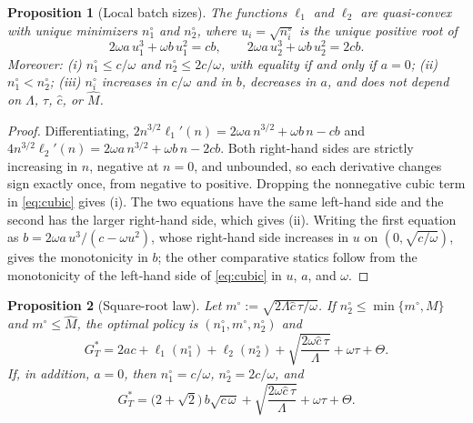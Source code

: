 \documentclass[10pt, reqno]{amsart}
\newtheorem{proposition}{Proposition}
\theoremstyle{definition}
\begin{document}
\begin{proposition}[Local batch sizes]\label{prop:local}
The functions $\ell_1$ and $\ell_2$ are quasi-convex with unique minimizers $n_1^\circ$ and $n_2^\circ$, where $u_i=\sqrt{n_i^\circ}$ is the unique positive root of
\begin{equation}\label{eq:cubic}
2\omega a\,u_1^3+\omega b\,u_1^2=cb,\qquad 2\omega a\,u_2^3+\omega b\,u_2^2=2cb .
\end{equation}
Moreover: (i) $n_1^\circ\le c/\omega$ and $n_2^\circ\le 2c/\omega$, with equality if and only if $a=0$; (ii) $n_1^\circ<n_2^\circ$; (iii) $n_i^\circ$ increases in $c/\omega$ and in $b$, decreases in $a$, and does not depend on $\Lambda$, $\tau$, $\hat c$, or $\hat M$.
\end{proposition}

\begin{proof}
Differentiating, $2n^{3/2}\ell_1'(n)=2\omega a\,n^{3/2}+\omega b\,n-cb$ and $4n^{3/2}\ell_2'(n)=2\omega a\,n^{3/2}+\omega b\,n-2cb$. Both right-hand sides are strictly increasing in $n$, negative at $n=0$, and unbounded, so each derivative changes sign exactly once, from negative to positive. Dropping the nonnegative cubic term in \eqref{eq:cubic} gives (i). The two equations have the same left-hand side and the second has the larger right-hand side, which gives (ii). Writing the first equation as $b=2\omega a\,u^3/(c-\omega u^2)$, whose right-hand side increases in $u$ on $(0,\sqrt{c/\omega})$, gives the monotonicity in $b$; the other comparative statics follow from the monotonicity of the left-hand side of \eqref{eq:cubic} in $u$, $a$, and $\omega$.
\end{proof}

\begin{proposition}[Square-root law]\label{prop:sqrt}
Let $m^\circ:=\sqrt{2\Lambda\hat c\,\tau/\omega}$. If $n_2^\circ\le\min\{m^\circ,M\}$ and $m^\circ\le\hat M$, the optimal policy is $(n_1^\circ,m^\circ,n_2^\circ)$ and
\begin{equation}\label{eq:GTstar}
G_T^*=2ac+\ell_1(n_1^\circ)+\ell_2(n_2^\circ)+\sqrt{\frac{2\omega\hat c\,\tau}{\Lambda}}+\omega\tau+\Theta .
\end{equation}
If, in addition, $a=0$, then $n_1^\circ=c/\omega$, $n_2^\circ=2c/\omega$, and
\begin{equation}\label{eq:GTstar0}
G_T^*=\big(2+\sqrt2\big)\,b\sqrt{c\,\omega}+\sqrt{\frac{2\omega\hat c\,\tau}{\Lambda}}+\omega\tau+\Theta .
\end{equation}
\end{proposition}
\end{document}
